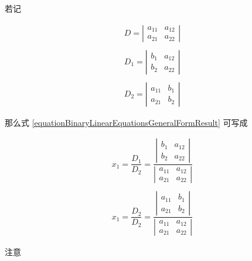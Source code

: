 若记

\begin{equation}
	\begin{array}{r}
	D = \left | \begin{array}{cc}
			a_{11} & a_{12}\\
			a_{21} & a_{22}
			\end{array} \right | \\
	\\
	D_{1} = \left | \begin{array}{cc}
		b_{1} & a_{12}\\
		b_{2} & a_{22}
		\end{array} \right | \\
	\\
	D_{2} = \left | \begin{array}{cc}
		a_{11} & b_{1}\\
		a_{21} & b_{2}
		\end{array} \right |
	\end{array}
\end{equation}

那么式 \ref{equationBinaryLinearEquationsGeneralFormResult} 可写成

\begin{equation}
	\begin{array}{r}
	x_{1}= \dfrac{D_{1}}{D_{2}} = \dfrac{\left | \begin{array}{cc}
			b_{1} & a_{12}\\
			b_{2} & a_{22}
			\end{array} \right |}{\left | \begin{array}{cc}
				a_{11} & a_{12}\\
				a_{21} & a_{22}
				\end{array} \right |}\\
	\\
	
	x_{1}= \dfrac{D_{2}}{D_{2}} = \dfrac{\left | \begin{array}{cc}
			a_{11} & b_{1}\\
			a_{21} & b_{2}
			\end{array} \right |}{\left | \begin{array}{cc}
					a_{11} & a_{12}\\
					a_{21} & a_{22}
					\end{array} \right |}
	\end{array}
\end{equation}

注意

